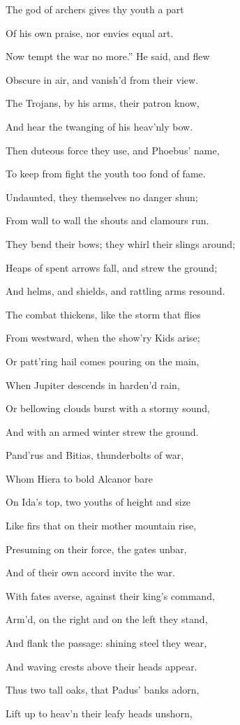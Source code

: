 The god of archers gives thy youth a part

Of his own praise, nor envies equal art.

Now tempt the war no more.” He said, and flew

Obscure in air, and vanish’d from their view.

The Trojans, by his arms, their patron know,

And hear the twanging of his heav’nly bow.

Then duteous force they use, and Phoebus’ name,

To keep from fight the youth too fond of fame.

Undaunted, they themselves no danger shun;

From wall to wall the shouts and clamours run.

They bend their bows; they whirl their slings around;

Heaps of spent arrows fall, and strew the ground;

And helms, and shields, and rattling arms resound.

The combat thickens, like the storm that flies

From westward, when the show’ry Kids arise;

Or patt’ring hail comes pouring on the main,

When Jupiter descends in harden’d rain,

Or bellowing clouds burst with a stormy sound,

And with an armed winter strew the ground.

Pand’rus and Bitias, thunderbolts of war,

Whom Hiera to bold Alcanor bare

On Ida’s top, two youths of height and size

Like firs that on their mother mountain rise,

Presuming on their force, the gates unbar,

And of their own accord invite the war.

With fates averse, against their king’s command,

Arm’d, on the right and on the left they stand,

And flank the passage: shining steel they wear,

And waving crests above their heads appear.

Thus two tall oaks, that Padus’ banks adorn,

Lift up to heav’n their leafy heads unshorn,

